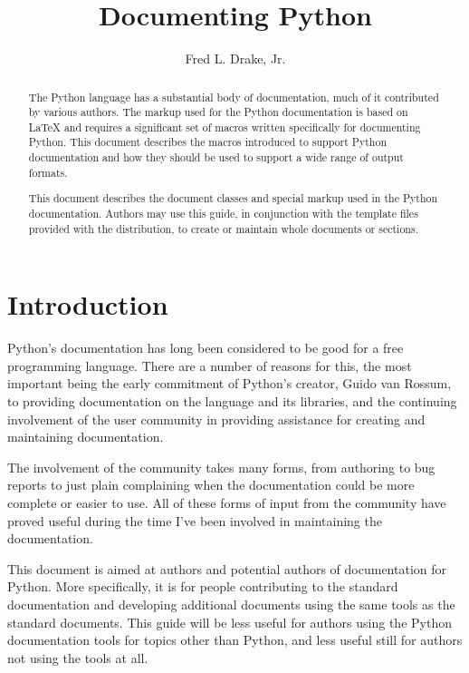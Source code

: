\documentclass{howto}
\title{Documenting Python}
\author{Fred L. Drake, Jr.}
\begin{document}
\maketitle

\begin{abstract}
\noindent
The Python language has a substantial body of
documentation, much of it contributed by various authors.  The markup
used for the Python documentation is based on \LaTeX{} and requires a
significant set of macros written specifically for documenting Python.
This document describes the macros introduced to support Python
documentation and how they should be used to support a wide range of
output formats.

This document describes the document classes and special markup used
in the Python documentation.  Authors may use this guide, in
conjunction with the template files provided with the
distribution, to create or maintain whole documents or sections.
\end{abstract}

\tableofcontents


\section{Introduction}

  Python's documentation has long been considered to be good for a
  free programming language.  There are a number of reasons for this,
  the most important being the early commitment of Python's creator,
  Guido van Rossum, to providing documentation on the language and its
  libraries, and the continuing involvement of the user community in
  providing assistance for creating and maintaining documentation.

  The involvement of the community takes many forms, from authoring to
  bug reports to just plain complaining when the documentation could
  be more complete or easier to use.  All of these forms of input from
  the community have proved useful during the time I've been involved
  in maintaining the documentation.

  This document is aimed at authors and potential authors of
  documentation for Python.  More specifically, it is for people
  contributing to the standard documentation and developing additional
  documents using the same tools as the standard documents.  This
  guide will be less useful for authors using the Python documentation
  tools for topics other than Python, and less useful still for
  authors not using the tools at all.
\end{document}
